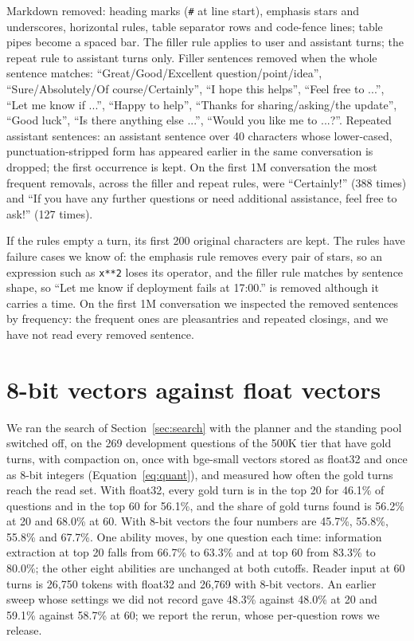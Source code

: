 Markdown removed: heading marks (\texttt{\#} at line start), emphasis stars and underscores, horizontal rules, table separator rows and code-fence lines; table pipes become a spaced bar. The filler rule applies to user and assistant turns; the repeat rule to assistant turns only. Filler sentences removed when the whole sentence matches: ``Great/Good/Excellent question/point/idea'', ``Sure/Absolutely/Of course/Certainly'', ``I hope this helps'', ``Feel free to ...'', ``Let me know if ...'', ``Happy to help'', ``Thanks for sharing/asking/the update'', ``Good luck'', ``Is there anything else ...'', ``Would you like me to ...?''. Repeated assistant sentences: an assistant sentence over 40 characters whose lower-cased, punctuation-stripped form has appeared earlier in the same conversation is dropped; the first occurrence is kept. On the first 1M conversation the most frequent removals, across the filler and repeat rules, were ``Certainly!'' (388 times) and ``If you have any further questions or need additional assistance, feel free to ask!'' (127 times).

If the rules empty a turn, its first 200 original characters are kept. The rules have failure cases we know of: the emphasis rule removes every pair of stars, so an expression such as \texttt{x**2} loses its operator, and the filler rule matches by sentence shape, so ``Let me know if deployment fails at 17:00.'' is removed although it carries a time. On the first 1M conversation we inspected the removed sentences by frequency: the frequent ones are pleasantries and repeated closings, and we have not read every removed sentence.

\section{8-bit vectors against float vectors}
\label{app:int8}

We ran the search of Section~\ref{sec:search} with the planner and the standing pool switched off, on the 269 development questions of the 500K tier that have gold turns, with compaction on, once with bge-small vectors stored as float32 and once as 8-bit integers (Equation~\ref{eq:quant}), and measured how often the gold turns reach the read set. With float32, every gold turn is in the top 20 for 46.1\% of questions and in the top 60 for 56.1\%, and the share of gold turns found is 56.2\% at 20 and 68.0\% at 60. With 8-bit vectors the four numbers are 45.7\%, 55.8\%, 55.8\% and 67.7\%. One ability moves, by one question each time: information extraction at top 20 falls from 66.7\% to 63.3\% and at top 60 from 83.3\% to 80.0\%; the other eight abilities are unchanged at both cutoffs. Reader input at 60 turns is 26,750 tokens with float32 and 26,769 with 8-bit vectors. An earlier sweep whose settings we did not record gave 48.3\% against 48.0\% at 20 and 59.1\% against 58.7\% at 60; we report the rerun, whose per-question rows we release.

